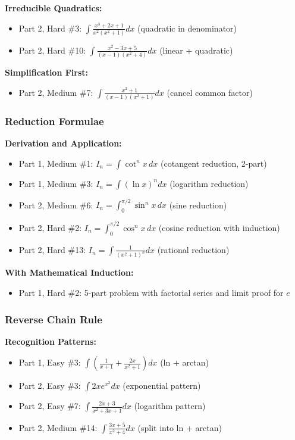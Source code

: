 \textbf{Irreducible Quadratics:}
\begin{itemize}
  \item Part 2, Hard \#3: $\int \frac{x^3+2x+1}{x^2(x^2+1)}dx$ (quadratic in denominator)
  \item Part 2, Hard \#10: $\int \frac{x^2-3x+5}{(x-1)(x^2+4)}dx$ (linear + quadratic)
\end{itemize}

\textbf{Simplification First:}
\begin{itemize}
  \item Part 2, Medium \#7: $\int \frac{x^2+1}{(x-1)(x^2+1)}dx$ (cancel common factor)
\end{itemize}

\subsubsection*{Reduction Formulae}

\textbf{Derivation and Application:}
\begin{itemize}
  \item Part 1, Medium \#1: $I_n = \int \cot^n x \, dx$ (cotangent reduction, 2-part)
  \item Part 1, Medium \#3: $I_n = \int (\ln x)^n dx$ (logarithm reduction)
  \item Part 2, Medium \#6: $I_n = \int_0^{\pi/2} \sin^n x \, dx$ (sine reduction)
  \item Part 2, Hard \#2: $I_n = \int_0^{\pi/2} \cos^n x \, dx$ (cosine reduction with induction)
  \item Part 2, Hard \#13: $I_n = \int \frac{1}{(x^2+1)^n}dx$ (rational reduction)
\end{itemize}

\textbf{With Mathematical Induction:}
\begin{itemize}
  \item Part 1, Hard \#2: 5-part problem with factorial series and limit proof for $e$
\end{itemize}

\subsubsection*{Reverse Chain Rule}

\textbf{Recognition Patterns:}
\begin{itemize}
  \item Part 1, Easy \#3: $\int \left(\frac{1}{x+1} + \frac{2x}{x^2+1}\right)dx$ (ln + arctan)
  \item Part 2, Easy \#3: $\int 2xe^{x^2}dx$ (exponential pattern)
  \item Part 2, Easy \#7: $\int \frac{2x+3}{x^2+3x+1}dx$ (logarithm pattern)
  \item Part 2, Medium \#14: $\int \frac{3x+5}{x^2+4}dx$ (split into ln + arctan)
\end{itemize}

